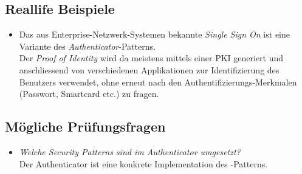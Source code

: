 \subsection*{Reallife Beispiele}
\begin{itemize}
	\item Das aus Enterprise-Netzwerk-Systemen bekannte \emph{Single Sign On} ist eine Variante des \emph{Authenticator}-Patterns.\\
	Der \emph{Proof of Identity} wird da meistens mittels einer PKI generiert und anschliessend von verschiedenen Applikationen zur Identifizierung des Benutzers verwendet, ohne erneut nach den Authentifizierungs-Merkmalen (Passwort, Smartcard etc.) zu fragen.
\end{itemize}

\subsection*{Mögliche Prüfungsfragen}
\begin{itemize}
	\item \emph{Welche Security Patterns sind im Authenticator umgesetzt?}\\
	Der Authenticator ist eine konkrete Implementation des -Patterns.
\end{itemize}
